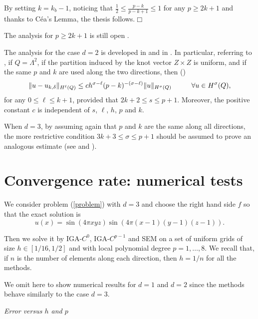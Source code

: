\documentclass[11pt]{article}
\begin{document}
By setting $k=k_b-1$, noticing that $\frac{1}{2}\leq \frac{p-k}{p-k+1}\leq 1$
for any $p\geq 2k+1$
and 
 thanks to C\'ea's Lemma, the thesis follows.\hfill{$\Box$}

\medskip
The analysis for $p\geq 2k+1$ is still open \cite[Remark 4.18]{bbsv}.

The analysis for the case $d=2$ is developed in \cite[Sect. 7]{bm-handbook}
and in 
 \cite{bbrs}. In particular, referring to \cite{bbrs}, if $Q=\Lambda^2$,
if the partition induced by the knot vector $Z\times Z$ is uniform, and if
the same 
$p$ and $k$ are used along the two directions, then 
(\cite[Cor. 8]{bbrs})
\begin{equation}
\|u-u_{k,\delta}\|_{H^\ell(Q)}\leq c h^{\sigma-\ell}(p-k)^{-(\sigma-\ell)}
\|u\|_{H^\sigma(Q)}
\hskip 1.cm \forall u\in H^\sigma(Q),
\end{equation}
for any $0\leq \ell\leq k+1$, provided that
$2k+2\leq s\leq p+1$. Moreover, the positive constant $c$ is 
independent of $s$, $\ell$, $h$, $p$ and $k$.

When $d=3$, by assuming again that  $p$ and $k$ are the same
along all directions, 
the more restrictive condition 
$3k+3\leq \sigma\leq p+1$ should be assumed to prove an analogous estimate
(see \cite[Remark 1, pag. 300]{bbrs} and \cite[Remark 7.1]{bm-handbook}).


\section{Convergence rate: numerical tests}

We consider problem (\ref{problem}) with $d=3$ and choose the right hand side $f$ 
so that the exact solution is
\begin{equation}\label{ex_sol}
u(x)=\sin(4\pi xyz)\sin(4\pi(x-1)(y-1)(z-1)).
\end{equation}

Then we solve it by  IGA-$C^0$, 
IGA-$C^{p-1}$ and SEM on a set of uniform grids of size $h\in[1/16,1/2]$ and
with local polynomial degree $p=1,\ldots,8$. 
We recall that, if $n$ is the number of
elements along each direction, then $h=1/n$ for all the methods.

We omit here to show numerical results for $d=1$ and $d=2$ since the 
methods behave similarly to the case $d=3$.


\null
\emph{Error versus $h$ and $p$}
\end{document}
